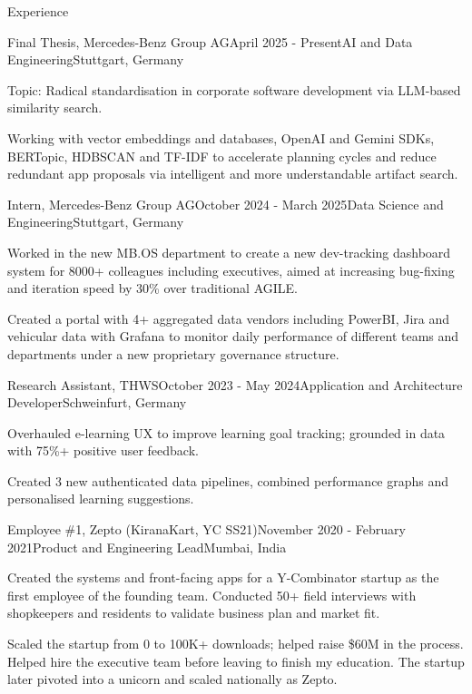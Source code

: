 \documentclass[
	a4paper, %
    10pt, %
]{resume} %
\begin{document}
\begin{rSection}{Experience}

	\begin{rSubsection}{Final Thesis, Mercedes-Benz Group AG}{April 2025 - Present}{AI and Data Engineering}{Stuttgart, Germany}
		\item Topic: Radical standardisation in corporate software development via LLM-based similarity search.
		\item Working with vector embeddings and databases, OpenAI and Gemini SDKs, BERTopic, HDBSCAN and TF-IDF to accelerate planning cycles and reduce redundant app proposals via intelligent and more understandable artifact search.
	\end{rSubsection}


	\begin{rSubsection}{Intern, Mercedes-Benz Group AG}{October 2024 - March 2025}{Data Science and Engineering}{Stuttgart, Germany}
		\item Worked in the new MB.OS department to create a new dev-tracking dashboard system for 8000+ colleagues including executives, aimed at increasing bug-fixing and iteration speed by 30\% over traditional AGILE.
		\item Created a portal with 4+ aggregated data vendors including PowerBI, Jira and vehicular data with Grafana to monitor daily performance of different teams and departments under a new proprietary governance structure.
	\end{rSubsection}


	\begin{rSubsection}{Research Assistant, THWS}{October 2023 - May 2024}{Application and Architecture Developer}{Schweinfurt, Germany}
		\item Overhauled e-learning UX to improve learning goal tracking; grounded in data with 75\%+ positive user feedback.
		\item Created 3 new authenticated data pipelines, combined performance graphs and personalised learning suggestions.
	\end{rSubsection}


	\begin{rSubsection}{Employee \#1, Zepto (KiranaKart, YC SS21)}{November 2020 - February 2021}{Product and Engineering Lead}{Mumbai, India}
		\item Created the systems and front-facing apps for a Y-Combinator startup as the first employee of the founding team. Conducted 50+ field interviews with shopkeepers and residents to validate business plan and market fit.
		\item Scaled the startup from 0 to 100K+ downloads; helped raise \$60M in the process. Helped hire the executive team before leaving to finish my education. The startup later pivoted into a unicorn and scaled nationally as Zepto.
	\end{rSubsection}


\end{rSection}
\end{document}
